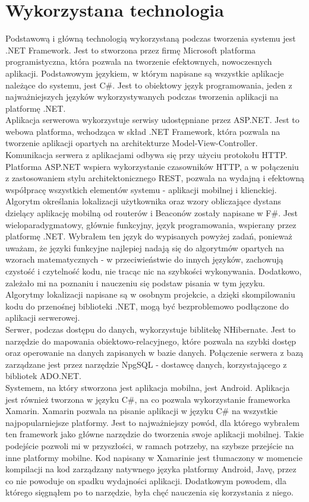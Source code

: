 \section{Wykorzystana technologia}
Podstawową i główną technologią wykorzystaną podczas tworzenia systemu jest .NET Framework. Jest to stworzona przez firmę Microsoft platforma programistyczna, która pozwala na tworzenie efektownych, nowoczesnych aplikacji. Podstawowym językiem, w którym napisane są wszystkie aplikacje należące do systemu, jest C\#. Jest to obiektowy język programowania, jeden z najważniejszych języków wykorzystywanych podczas tworzenia aplikacji na platformę .NET.\\
Aplikacja serwerowa wykorzystuje serwisy udostępniane przez ASP.NET. Jest to webowa platforma, wchodząca w skład .NET Framework, która pozwala na tworzenie aplikacji opartych na architekturze Model-View-Controller. Komunikacja serwera z aplikacjami odbywa się przy użyciu protokołu HTTP. Platforma ASP.NET wspiera wykorzystanie czasowników HTTP, a w połączeniu z zastosowaniem stylu architektonicznego REST, pozwala na wydajną i efektowną współpracę wszystkich elementów systemu - aplikacji mobilnej i klienckiej.\\
Algorytm określania lokalizacji użytkownika oraz wzory obliczające dystans dzielący aplikację mobilną od routerów i Beaconów zostały napisane w F\#. Jest wieloparadygmatowy, głównie funkcyjny, język programowania, wspierany przez platformę .NET. Wybrałem ten język do wypisanych powyżej zadań, ponieważ uważam, że języki funkcyjne najlepiej nadają się do algorytmów opartych na wzorach matematycznych - w przeciwieństwie do innych języków, zachowują czystość i czytelność kodu, nie tracąc nic na szybkości wykonywania. Dodatkowo, zależało mi na poznaniu i nauczeniu się podstaw pisania w tym języku. Algorytmy lokalizacji napisane są w osobnym projekcie, a dzięki skompilowaniu kodu do przenośnej biblioteki .NET, mogą być bezproblemowo podłączone do aplikacji serwerowej.\\
Serwer, podczas dostępu do danych, wykorzystuje biblitekę NHibernate. Jest to narzędzie do mapowania obiektowo-relacyjnego, które pozwala na szybki dostęp oraz operowanie na danych zapisanych w bazie danych. Połączenie serwera z bazą zarządzane jest przez narzędzie NpgSQL - dostawcę danych, korzystającego z bibliotek ADO.NET.\\
Systemem, na który stworzona jest aplikacja mobilna, jest Android. Aplikacja jest również tworzona w języku C\#, na co pozwala wykorzystanie frameworka Xamarin. Xamarin pozwala na pisanie aplikacji w języku C\# na wszystkie najpopularniejsze platformy. Jest to najważniejszy powód, dla którego wybrałem ten framework jako główne narzędzie do tworzenia swoje aplikacji mobilnej. Takie podejście pozwoli mi w przyszłości, w ramach potrzeby, na szybsze przejście na inne platformy mobilne. Kod napisany w Xamarinie jest tłumaczony w momencie kompilacji na kod zarządzany natywnego języka platformy Android, Javę, przez co nie powoduje on spadku wydajności aplikacji. Dodatkowym powodem, dla którego sięgnąłem po to narzędzie, była chęć nauczenia się korzystania z niego.\\
